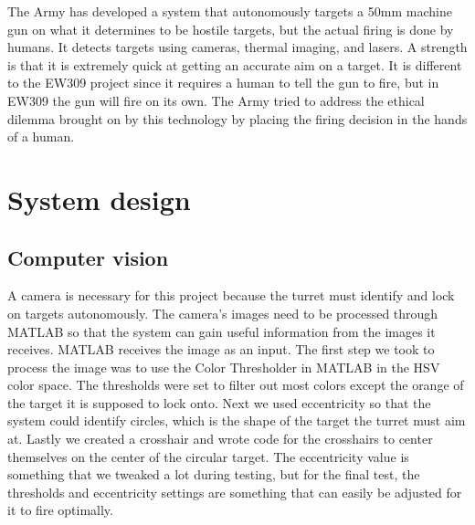 \documentclass{article}
\begin{document}
The Army has developed a system that autonomously targets a 50mm machine gun on what it determines to be hostile targets, but the actual firing is done by humans. It detects targets using cameras, thermal imaging, and lasers. A strength is that it is extremely quick at getting an accurate aim on a target. It is different to the EW309 project since it requires a human to tell the gun to fire, but in EW309 the gun will fire on its own. The Army tried to address the ethical dilemma brought on by this technology by placing the firing decision in the hands of a human.





\section{System design}

\subsection{Computer vision}
A camera is necessary for this project because the turret must identify and lock on targets autonomously. The camera’s images need to be processed through MATLAB so that the system can gain useful information from the images it receives. MATLAB receives the image as an input. The first step we took to process the image was to use the Color Thresholder in MATLAB in the HSV color space. The thresholds were set to filter out most colors except the orange of the target it is supposed to lock onto. Next we used eccentricity so that the system could identify circles, which is the shape of the target the turret must aim at. Lastly we created a crosshair and wrote code for the crosshairs to center themselves on the center of the circular target. The eccentricity value is something that we tweaked a lot during testing, but for the final test, the thresholds and eccentricity settings are something that can easily be adjusted for it to fire optimally. 

\end{document}
